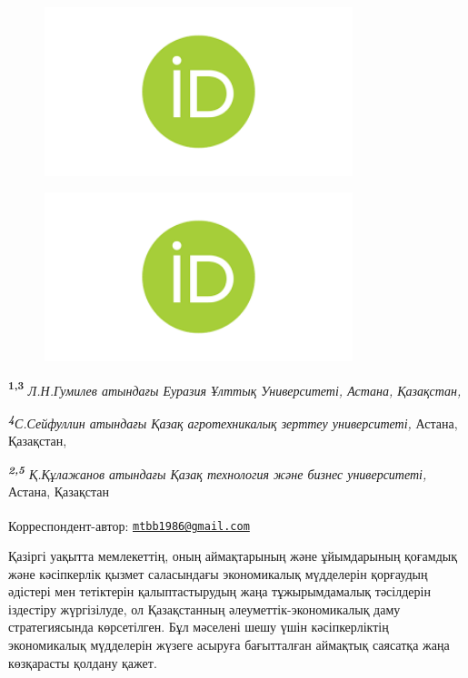 \begin{figure}[H]
	\centering
	\includegraphics[width=0.8\textwidth]{media/ekon2/image6}
	\caption*{}
\end{figure}

\begin{figure}[H]
	\centering
	\includegraphics[width=0.8\textwidth]{media/ekon2/image6}
	\caption*{}
\end{figure}


{\bfseries \textsuperscript{1,3}} \emph{Л.Н.Гумилев атындағы Еуразия Ұлттық
Университеті, Астана, Қазақстан,}

\emph{{\bfseries \textsuperscript{4}}С.Сейфуллин атындағы Қазақ
агротехникалық зерттеу университеті,} Астана, Қазақстан,

\emph{{\bfseries \textsuperscript{2,5}} Қ.Құлажанов атындағы Қазақ
технология және бизнес университеті,} Астана, Қазақстан

{\bfseries \textsuperscript{\envelope }}Корреспондент-автор:
\href{mailto:mtbb1986@gmail.com}{\nolinkurl{mtbb1986@gmail.com}}

Қазіргі уақытта мемлекеттің, оның аймақтарының және ұйымдарының қоғамдық
және кәсіпкерлік қызмет саласындағы экономикалық мүдделерін қорғаудың
әдістері мен тетіктерін қалыптастырудың жаңа тұжырымдамалық тәсілдерін
іздестіру жүргізілуде, ол Қазақстанның әлеуметтік-экономикалық даму
стратегиясында көрсетілген. Бұл мәселені шешу үшін кәсіпкерліктің
экономикалық мүдделерін жүзеге асыруға бағытталған аймақтық саясатқа
жаңа көзқарасты қолдану қажет.

